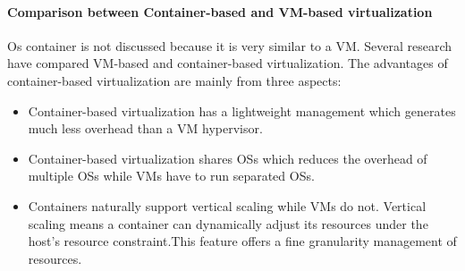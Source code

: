 


\paragraph{Comparison between Container-based and VM-based virtualization} 
\label{sec:comparison_container_vm}
  Os container is not discussed because it is very similar to a VM.
Several research \cite{Felter:2015ki, Xavier:2013fy, Dua:2014bw} have compared VM-based and container-based virtualization. 
The advantages of container-based virtualization are mainly from three aspects:

\begin{itemize}
	\item Container-based virtualization has a lightweight management which generates much less overhead than a VM hypervisor. 
	\item Container-based virtualization shares OSs which reduces the overhead of multiple OSs while VMs have to run separated OSs.
	\item Containers naturally support vertical scaling while VMs do not. Vertical scaling means a container can dynamically adjust its resources under the host's resource constraint.This feature offers a fine granularity management of resources. 
\end{itemize}

